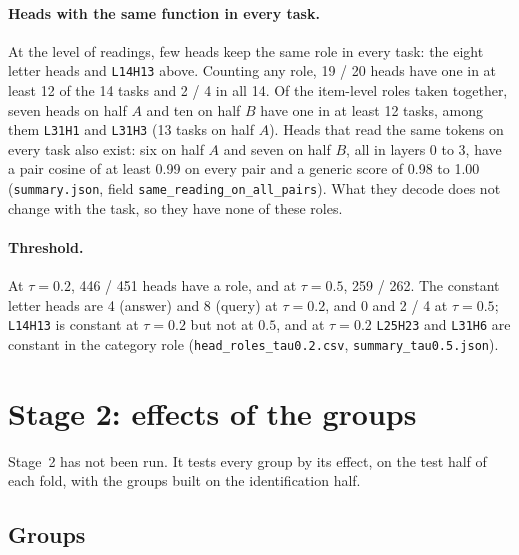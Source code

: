 \documentclass[10pt,a4paper]{article}
\newcommand{\hd}[1]{\texttt{#1}}
\begin{document}
\paragraph{Heads with the same function in every task.} At the level of readings, few heads keep the same role in every task: the eight letter heads and \hd{L14H13} above. Counting any role, 19 / 20 heads have one in at least 12 of the 14 tasks and 2 / 4 in all 14. Of the item-level roles taken together, seven heads on half $A$ and ten on half $B$ have one in at least 12 tasks, among them \hd{L31H1} and \hd{L31H3} (13 tasks on half $A$). Heads that read the same tokens on every task also exist: six on half $A$ and seven on half $B$, all in layers 0 to 3, have a pair cosine of at least 0.99 on every pair and a generic score of 0.98 to 1.00 (\texttt{summary.json}, field \texttt{same\_reading\_on\_all\_pairs}). What they decode does not change with the task, so they have none of these roles.

\paragraph{Threshold.} At $\tau=0.2$, 446 / 451 heads have a role, and at $\tau=0.5$, 259 / 262. The constant letter heads are 4 (answer) and 8 (query) at $\tau=0.2$, and 0 and 2 / 4 at $\tau=0.5$; \hd{L14H13} is constant at $\tau=0.2$ but not at $0.5$, and at $\tau=0.2$ \hd{L25H23} and \hd{L31H6} are constant in the category role (\texttt{head\_roles\_tau0.2.csv}, \texttt{summary\_tau0.5.json}).

\section{Stage 2: effects of the groups}\label{sec:stage2}

Stage~2 has not been run. It tests every group by its effect, on the test half of each fold, with the groups built on the identification half.

\subsection{Groups}\label{sec:groups}
\end{document}

